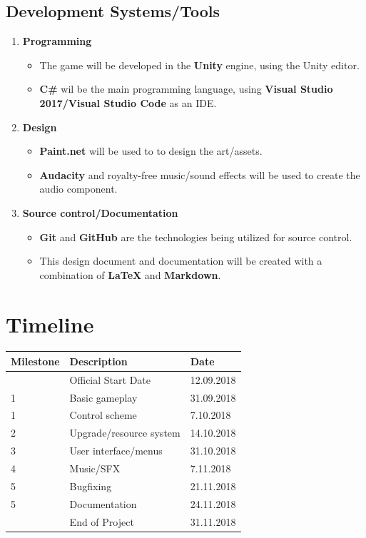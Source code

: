 \documentclass[a4paper]{scrreprt}
\begin{document}
\section{Development Systems/Tools}
\begin{enumerate}
  \item \textbf{Programming}
  \begin{itemize}
    \item The game will be developed in the \textbf{Unity} engine, using the Unity editor. 
    \item \textbf{C\#} wil be the main programming language, using \textbf{Visual Studio 2017/Visual Studio Code} as an IDE.
  \end{itemize}
  \item \textbf{Design}
  \begin{itemize}
    \item \textbf{Paint.net} will be used to to design the art/assets.
    \item \textbf{Audacity} and royalty-free music/sound effects will be used to create the audio component.
  \end{itemize}
  \item \textbf{Source control/Documentation}
  \begin{itemize}
    \item \textbf{Git} and \textbf{GitHub} are the technologies being utilized for source control. 
    \item This design document and documentation will be created with a combination of \textbf{LaTeX} and \textbf{Markdown}.
  \end{itemize}

\end{enumerate}


  



\chapter{Timeline}
\begin{table}[h]
\centering
\begin{tabular}{|l|l|l|}
\hline
\textbf{Milestone} & \textbf{Description} & \textbf{Date} \\\hline
& Official Start Date & 12.09.2018 \\
1 & Basic gameplay & 31.09.2018 \\
1 & Control scheme & 7.10.2018 \\
2 & Upgrade/resource system  & 14.10.2018 \\
3 & User interface/menus &31.10.2018 \\
4 & Music/SFX & 7.11.2018 \\
5 & Bugfixing & 21.11.2018 \\
5 & Documentation & 24.11.2018 \\
& End of Project & 31.11.2018 \\
\hline
\end{tabular}
\end{table}
\end{document}
